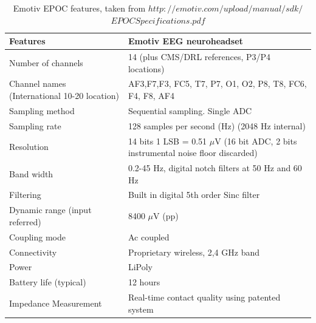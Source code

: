 \begin{table}[ht]
\centering
\begin{tabular}{| m{.47\linewidth} | m{.47\linewidth} |}
			
			\hline 
			\textbf{Features} & \textbf{Emotiv EEG neuroheadset}  \\
			\hline 
			Number of channels & 14 (plus CMS/DRL references, P3/P4 locations)   \\
			\hline 
			Channel names (International 10-20 location)  & AF3,F7,F3, FC5, T7, P7, O1, O2, P8, T8, FC6, F4, F8, AF4  \\
			\hline 
			Sampling method & Sequential sampling. Single ADC \\
			\hline 
			Sampling rate & 128 samples per second (Hz) (2048 Hz internal) \\
			\hline
			Resolution & 14 bits 1 LSB = 0.51 $\mu$V (16 bit ADC, 2 bits instrumental noise floor discarded) \\
			\hline
			Band width & 0.2-45 Hz, digital notch filters at 50 Hz and 60 Hz\\
			\hline
			Filtering & Built in digital 5th order Sinc filter\\
            \hline
			Dynamic range (input referred) & 8400 $\mu$V (pp)\\
            \hline
			Coupling mode & Ac coupled\\
            \hline
			Connectivity & Proprietary wireless, 2,4 GHz band\\
            \hline
			Power & LiPoly \\
            \hline
			Battery life (typical) & 12 hours \\
            \hline
			Impedance Measurement & Real-time contact quality using patented system \\
            \hline
		\end{tabular}
        
\caption{Emotiv EPOC features, taken from \textbf{$http://emotiv.com/upload/manual/sdk/$
$EPOCSpecifications.pdf$}}
\label{table:1}
\end{table}




